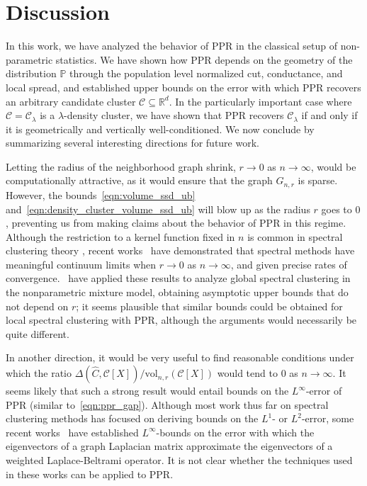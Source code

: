 \documentclass[11pt,twoside]{article}
\newcommand{\Reals}{\mathbb{R}}
\newcommand{\1}{\mathbf{1}}
\newcommand{\Rd}{\Reals^d}
\newcommand{\Leb}{L}
\newcommand{\mc}[1]{\mathcal{#1}}
\newcommand{\Pbb}{\mathbb{P}}
\newcommand{\wh}[1]{\widehat{#1}}
\newcommand{\vol}{\mathrm{vol}}
\begin{document}
\section{Discussion}
\label{sec:discussion}
In this work, we have analyzed the behavior of PPR in the classical setup of non-parametric statistics. We have shown how PPR depends on the geometry of the distribution $\Pbb$ through the population level normalized cut, conductance, and local spread, and established upper bounds on the error with which PPR recovers an arbitrary candidate cluster $\mc{C} \subseteq \Rd$.  In the particularly important case where $\mc{C} = \mc{C}_{\lambda}$ is a $\lambda$-density cluster, we have shown that PPR recovers $\mc{C}_{\lambda}$ if and only if it is geometrically and vertically well-conditioned. We now conclude by summarizing several interesting directions for future work.

Letting the radius of the neighborhood graph shrink, $r \to 0$ as $n \to  
\infty$, would be computationally attractive, as it would ensure that the graph 
$G_{n,r}$ is sparse. However, the bounds~\eqref{eqn:volume_ssd_ub} and~\eqref{eqn:density_cluster_volume_ssd_ub} will blow up as the radius $r$ goes to $0$, preventing us from making claims about the behavior of PPR in
this regime. Although the restriction to a kernel function fixed in $n$ is
common in spectral clustering theory \citep{vonluxburg2008, schiebinger2015, singer2017},
recent works~\citep{shi2015, calder2019, garciatrillos18, garciatrillos2020, yuan2020} have demonstrated that spectral methods have meaningful continuum limits when $r \to 0$ as $n \to \infty$, and given precise rates of convergence.~\cite{garciatrillos19} have applied these results to analyze global spectral clustering in the nonparametric mixture model, obtaining asymptotic upper bounds that do not depend on $r$; it seems plausible that similar bounds could be obtained for local spectral clustering with PPR, although the arguments would necessarily be quite different.

In another direction, it would be very useful to find reasonable conditions under which the ratio $\Delta(\wh{C},\mc{C}[X])/\vol_{n,r}(\mc{C}[X])$ would tend to $0$ as $n \to \infty$. It seems likely that such a strong result would entail bounds on the $\Leb^{\infty}$-error of PPR (similar to~\eqref{eqn:ppr_gap}). Although most work thus far on spectral clustering methods has focused on deriving bounds on the $\Leb^1$- or $\Leb^2$-error, some recent works~\citep{dunson2020,calder2020} have established $\Leb^{\infty}$-bounds on the error with which the eigenvectors of a graph Laplacian matrix approximate the eigenvectors of a weighted Laplace-Beltrami operator. It is not clear whether the techniques used in these works can be applied to PPR.
\end{document}
